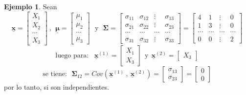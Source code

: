 \documentclass[
]{book}
\theoremstyle{definition}
\theoremstyle{definition}
\newtheorem{example}{Ejemplo}[chapter]
\theoremstyle{definition}
\theoremstyle{definition}
\theoremstyle{remark}
\begin{document}
\begin{example}
Sean
\[
\underline{\mathbf{x}}=\begin{bmatrix}
X_1 \\ X_2 \\ \cdots \\ X_3
\end{bmatrix}\ , \ \ \underline{\mathbf{\mu}}=\begin{bmatrix}
\mu_1 \\ \mu_2 \\ \cdots \\ \mu_3
\end{bmatrix}\ \ \ \text{y} \ \ \ \mathbf{\Sigma}=\begin{bmatrix}
\sigma_{11} & \sigma_{12} & \vdots & \sigma_{13}\\
\sigma_{21} & \sigma_{22}& \vdots & \sigma_{23}\\
\cdots & \cdots & \cdots & \cdots\\
\sigma_{31} &\sigma_{32} & \vdots & \sigma_{33}
\end{bmatrix}=\begin{bmatrix}
4 & 1 & \vdots & 0\\
1 & 3& \vdots & 0\\
\cdots & \cdots & \cdots & \cdots\\
0 &0 & \vdots & 2
\end{bmatrix}
\]
\[
\text{luego para}:\  \  \ \underline{\mathbf{x}}^{(1)}=\begin{bmatrix}
X_1 \\ X_3
\end{bmatrix}\  \ \text{y} \ \ \underline{\mathbf{x}}^{(2)}=\begin{bmatrix} X_3
\end{bmatrix}
\]
\[
\text{se tiene:} \ \ \ \mathbf{\Sigma}_{12}=Cov\left(\underline{\mathbf{x}}^{(1)}\ , \ \underline{\mathbf{x}}^{(2)}\right)=\begin{bmatrix}
\sigma_{13} \\ \sigma_{23}
\end{bmatrix}=\begin{bmatrix}
0\\0
\end{bmatrix}
\]
por lo tanto, si son independientes.
\end{example}
\end{document}
